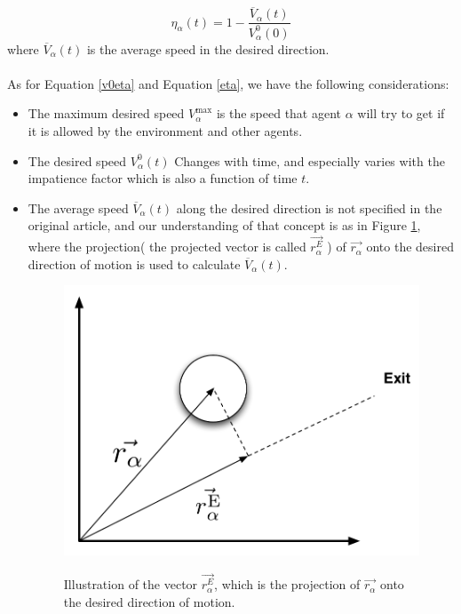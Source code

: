 \begin{equation}\label{eta}
	\eta_{\alpha} \left( t \right) =
    1 - \frac{\overline{V}_{\alpha} \left( t \right)}
             {V_{\alpha}^{0} \left( 0 \right)}
\end{equation}
where $\overline{V}_{\alpha}\left( t \right)$ is the average speed in the desired direction.\\\\
As for Equation \ref{v0eta} and Equation \ref{eta}, we have the following considerations:
\begin{itemize}
\item The maximum desired speed $V_{\alpha}^{\text{max}}$ is the speed that agent $\alpha$ will try to get if it is allowed by the 
environment and other agents. 
\item The desired speed $V_{\alpha}^{0} \left( t \right)$ Changes with time, and especially varies with the impatience factor which is also a function of time $ t $.
\item The average speed $\overline{V}_{\alpha} \left( t \right)$ along the desired direction is not specified in the original article, and our understanding of that concept is as in Figure \ref{impatience}, where the projection( the projected vector is called $ \vec{r_{\alpha}^{E}}$ ) of $ \vec{r_{\alpha}} $ onto the desired direction of motion is used to calculate $\overline{V}_{\alpha} \left( t \right)$.

\begin{figure}[ht]
\centering
{\includegraphics[scale=0.35]{Figures/NotationOfAgent2.pdf}} 
\caption{Illustration of the vector $ \vec{r_{\alpha}^{E}}$, which is the projection of $ \vec{r_{\alpha}} $ onto the desired direction of motion.}
\label{impatience}
\end{figure}


\end{itemize}

